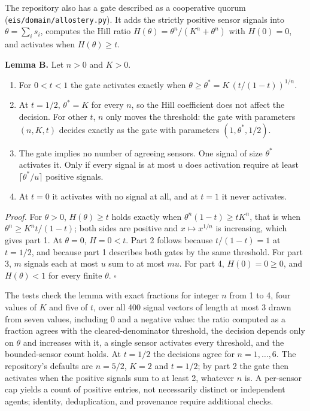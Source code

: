 \documentclass[
  11pt,
]{article}
\providecommand{\tightlist}{%
  \setlength{\itemsep}{0pt}\setlength{\parskip}{0pt}}
\begin{document}
The repository also has a gate described as a cooperative quorum
(\texttt{\nolinkurl{eis/domain/allostery.py}}).
It adds the strictly positive sensor signals into
\(\theta = \sum_i s_i\), computes the Hill ratio
\(H(\theta) = \theta^n / (K^n + \theta^n)\) with \(H(0) = 0\), and
activates when \(H(\theta) \geq t\).

\textbf{Lemma B.} Let \(n > 0\) and \(K > 0\).

\begin{enumerate}
\def\labelenumi{\arabic{enumi}.}
\tightlist
\item
  For \(0 < t < 1\) the gate activates exactly when
  \(\theta \geq \theta^* = K \, (t / (1 - t))^{1/n}\).
\item
  At \(t = 1/2\), \(\theta^* = K\) for every \(n\), so the Hill
  coefficient does not affect the decision. For other \(t\), \(n\) only
  moves the threshold: the gate with parameters \((n, K, t)\) decides
  exactly as the gate with parameters \((1, \theta^*, 1/2)\).
\item
  The gate implies no number of agreeing sensors. One signal of size
  \(\theta^*\) activates it. Only if every signal is at most \(u\) does
  activation require at least \(\lceil \theta^* / u \rceil\) positive
  signals.
\item
  At \(t = 0\) it activates with no signal at all, and at \(t = 1\) it
  never activates.
\end{enumerate}

\emph{Proof.} For \(\theta > 0\), \(H(\theta) \geq t\) holds exactly
when \(\theta^n (1 - t) \geq t K^n\), that is when
\(\theta^n \geq K^n t / (1 - t)\); both sides are positive and
\(x \mapsto x^{1/n}\) is increasing, which gives part 1. At
\(\theta = 0\), \(H = 0 < t\). Part 2 follows because
\(t / (1 - t) = 1\) at \(t = 1/2\), and because part 1 describes both
gates by the same threshold. For part 3, \(m\) signals each at most
\(u\) sum to at most \(mu\). For part 4, \(H(0) = 0 \geq 0\), and
\(H(\theta) < 1\) for every finite \(\theta\). \(\square\)

The tests check the lemma with exact fractions for integer \(n\) from 1
to 4, four values of \(K\) and five of \(t\), over all 400 signal
vectors of length at most 3 drawn from seven values, including 0 and a
negative value: the ratio computed as a fraction agrees with the
cleared-denominator threshold, the decision depends only on \(\theta\)
and increases with it, a single sensor activates every threshold, and
the bounded-sensor count holds. At \(t = 1/2\) the decisions agree for
\(n = 1, \ldots, 6\). The repository's defaults are \(n = 5/2\),
\(K = 2\) and \(t = 1/2\); by part 2 the gate then activates when the
positive signals sum to at least 2, whatever \(n\) is. A per-sensor cap
yields a count of positive entries, not necessarily distinct or
independent agents; identity, deduplication, and provenance require
additional checks.
\end{document}
